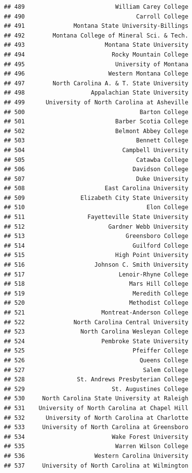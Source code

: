 \documentclass[]{article}
\begin{document}
\begin{verbatim}
## 489                          William Carey College
## 490                                Carroll College
## 491              Montana State University-Billings
## 492        Montana College of Mineral Sci. & Tech.
## 493                       Montana State University
## 494                         Rocky Mountain College
## 495                          University of Montana
## 496                        Western Montana College
## 497        North Carolina A. & T. State University
## 498                   Appalachian State University
## 499      University of North Carolina at Asheville
## 500                                 Barton College
## 501                          Barber Scotia College
## 502                          Belmont Abbey College
## 503                                Bennett College
## 504                            Campbell University
## 505                                Catawba College
## 506                               Davidson College
## 507                                Duke University
## 508                       East Carolina University
## 509                Elizabeth City State University
## 510                                   Elon College
## 511                  Fayetteville State University
## 512                        Gardner Webb University
## 513                             Greensboro College
## 514                               Guilford College
## 515                          High Point University
## 516                    Johnson C. Smith University
## 517                           Lenoir-Rhyne College
## 518                              Mars Hill College
## 519                               Meredith College
## 520                              Methodist College
## 521                      Montreat-Anderson College
## 522              North Carolina Central University
## 523                North Carolina Wesleyan College
## 524                      Pembroke State University
## 525                               Pfeiffer College
## 526                                 Queens College
## 527                                  Salem College
## 528               St. Andrews Presbyterian College
## 529                         St. Augustines College
## 530     North Carolina State University at Raleigh
## 531    University of North Carolina at Chapel Hill
## 532      University of North Carolina at Charlotte
## 533     University of North Carolina at Greensboro
## 534                         Wake Forest University
## 535                          Warren Wilson College
## 536                    Western Carolina University
## 537     University of North Carolina at Wilmington

\end{verbatim}
\end{document}
